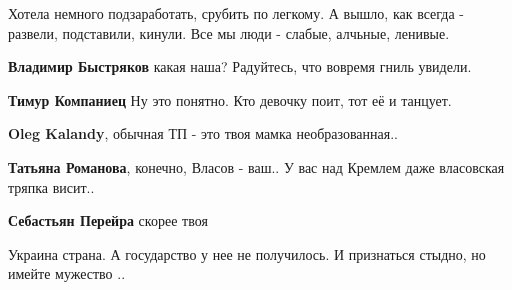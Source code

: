 \begin{itemize}
\begin{itemize}
Хотела немного подзаработать, срубить по легкому. А вышло, как всегда -
развели, подставили, кинули. Все мы люди - слабые, алчьные, ленивые.

 
\textbf{Владимир Быстряков} какая наша? Радуйтесь, что вовремя гниль увидели.

 
\textbf{Тимур Компаниец} Ну это понятно. Кто девочку поит, тот её и танцует.

 
\textbf{Oleg Kalandy}, обычная ТП - это твоя мамка необразованная..

 
\textbf{Татьяна Романова}, конечно, Власов - ваш.. У вас над Кремлем даже власовская тряпка висит..

 
\textbf{Себастьян Перейра} скорее твоя

 
Украина страна. А государство у нее не получилось. И признаться стыдно, но имейте мужество ..

 

\end{itemize}
\end{itemize}
